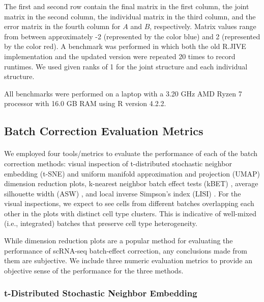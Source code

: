 \documentclass[
12pt, %
letterpaper, %
oneside, %
headinclude,footinclude, %
BCOR5mm, %
]{scrartcl}
\begin{document}
The first and second row contain the final matrix in the first column, the joint matrix in the second column, the individual matrix in the third column, and the error matrix in the fourth column for $A$ and $B$, respectively. Matrix values range from between approximately -2 (represented by the color blue) and 2 (represented by the color red). A benchmark was performed in which both the old R.JIVE implementation and the updated version were repeated 20 times to record runtimes. We used given ranks of 1 for the joint structure and each individual structure.

All benchmarks were performed on a laptop with a 3.20 GHz AMD Ryzen 7 processor with 16.0 GB RAM using R version 4.2.2.


\subsection{Batch Correction Evaluation Metrics}

\paragraph*{}
We employed four tools/metrics to evaluate the performance of each of the batch correction methods: visual inspection of t-distributed stochastic neighbor embedding (t-SNE) \citep{van2008visualizing} and uniform manifold approximation and projection (UMAP) \citep{mcinnes2018umap} dimension reduction plots, k-nearest neighbor batch effect tests (kBET) \citep{buttner2019test}, average silhouette width (ASW) \citep{rousseeuw1987silhouettes}, and local inverse Simpson's index (LISI) \citep{korsunsky2019fast}. For the visual inspections, we expect to see cells from different batches overlapping each other in the plots with distinct cell type clusters. This is indicative of well-mixed (i.e., integrated) batches that preserve cell type heterogeneity.

While dimension reduction plots are a popular method for evaluating the performance of scRNA-seq batch-effect correction, any conclusions made from them are subjective. We include three numeric evaluation metrics to provide an objective sense of the performance for the three methods.

\subsubsection*{t-Distributed Stochastic Neighbor Embedding}
\end{document}
